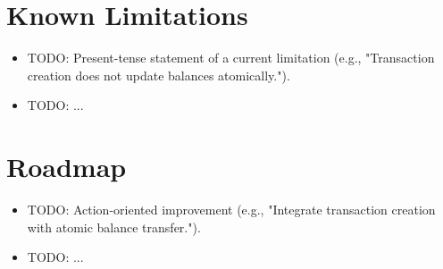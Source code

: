 \section{Known Limitations}
%
%
\begin{itemize}
  \item TODO: Present-tense statement of a current limitation
        (e.g., "Transaction creation does not update balances atomically.").
  \item TODO: ...
\end{itemize}

\section{Roadmap}
%
%
\begin{itemize}
  \item TODO: Action-oriented improvement
        (e.g., "Integrate transaction creation with atomic balance transfer.").
  \item TODO: ...
\end{itemize}
